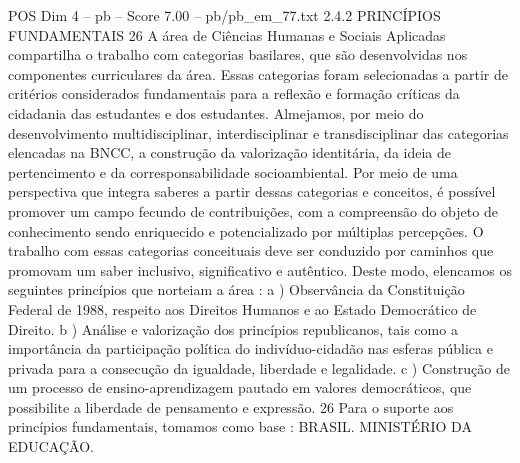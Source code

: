 \begin{textsample}{POS Dim 4 – pb – Score 7.00 – pb/pb\_em\_77.txt}  \label{ex:f4_pos_266}
2.4.2 PRINCÍPIOS FUNDAMENTAIS 26 A área de Ciências Humanas e Sociais Aplicadas compartilha o trabalho com categorias basilares, que são desenvolvidas nos componentes curriculares da área.
Essas categorias foram selecionadas a partir de critérios considerados fundamentais para a reflexão e formação críticas da cidadania das estudantes e dos estudantes.
Almejamos, por meio do desenvolvimento multidisciplinar, interdisciplinar e transdisciplinar das categorias elencadas na BNCC, a construção da valorização identitária, da ideia de pertencimento e da corresponsabilidade socioambiental.
Por meio de uma perspectiva que integra saberes a partir dessas categorias e conceitos, é possível promover um campo fecundo de contribuições, com a compreensão do objeto de conhecimento sendo enriquecido e potencializado por múltiplas percepções.
O trabalho com essas categorias conceituais deve ser conduzido por caminhos que promovam um saber inclusivo, significativo e autêntico.
Deste modo, elencamos os seguintes princípios que norteiam a área : a ) Observância da Constituição Federal de 1988, respeito aos Direitos Humanos e ao Estado Democrático de Direito. b ) Análise e valorização dos princípios republicanos, tais como a importância da participação política do indivíduo-cidadão nas esferas pública e privada para a consecução da igualdade, liberdade e legalidade. c ) Construção de um processo de ensino-aprendizagem pautado em valores democráticos, que possibilite a liberdade de pensamento e expressão. 26 Para o suporte aos princípios fundamentais, tomamos como base : BRASIL.
MINISTÉRIO DA EDUCAÇÃO.

\end{textsample}
